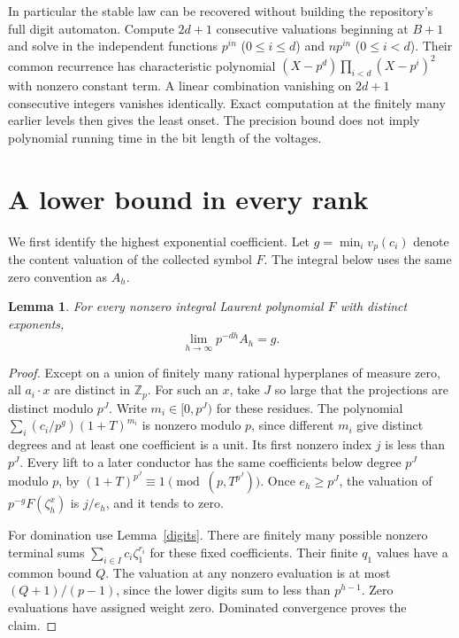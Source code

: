 \documentclass[11pt]{article}
\newtheorem{lemma}[theorem]{Lemma}
\newcommand{\Z}{\mathbb Z}
\begin{document}
In particular the stable law can be recovered without building the repository's full digit automaton. Compute $2d+1$ consecutive valuations beginning at $B+1$ and solve in the independent functions $p^{in}$ ($0\le i\le d$) and $np^{in}$ ($0\le i<d$). Their common recurrence has characteristic polynomial $(X-p^d)\prod_{i<d}(X-p^i)^2$ with nonzero constant term. A linear combination vanishing on $2d+1$ consecutive integers vanishes identically. Exact computation at the finitely many earlier levels then gives the least onset. The precision bound does not imply polynomial running time in the bit length of the voltages.

\section{A lower bound in every rank}
We first identify the highest exponential coefficient. Let $g=\min_i v_p(c_i)$ denote the content valuation of the collected symbol $F$. The integral below uses the same zero convention as $A_h$.

\begin{lemma}\label{content}
For every nonzero integral Laurent polynomial $F$ with distinct exponents,
\[
\lim_{h\to\infty}p^{-dh}A_h=g.
\]
\end{lemma}
\begin{proof}
Except on a union of finitely many rational hyperplanes of measure zero, all $a_i\cdot x$ are distinct in $\Z_p$. For such an $x$, take $J$ so large that the projections are distinct modulo $p^J$. Write $m_i\in[0,p^J)$ for these residues. The polynomial $\sum_i(c_i/p^g)(1+T)^{m_i}$ is nonzero modulo $p$, since different $m_i$ give distinct degrees and at least one coefficient is a unit. Its first nonzero index $j$ is less than $p^J$. Every lift to a later conductor has the same coefficients below degree $p^J$ modulo $p$, by $(1+T)^{p^J}\equiv1\pmod{(p,T^{p^J})}$. Once $e_h\ge p^J$, the valuation of $p^{-g}F(\zeta_h^x)$ is $j/e_h$, and it tends to zero.

For domination use Lemma~\ref{digits}. There are finitely many possible nonzero terminal sums $\sum_{i\in I}c_i\zeta_1^{r_i}$ for these fixed coefficients. Their finite $q_1$ values have a common bound $Q$. The valuation at any nonzero evaluation is at most $(Q+1)/(p-1)$, since the lower digits sum to less than $p^{h-1}$. Zero evaluations have assigned weight zero. Dominated convergence proves the claim.
\end{proof}
\end{document}
